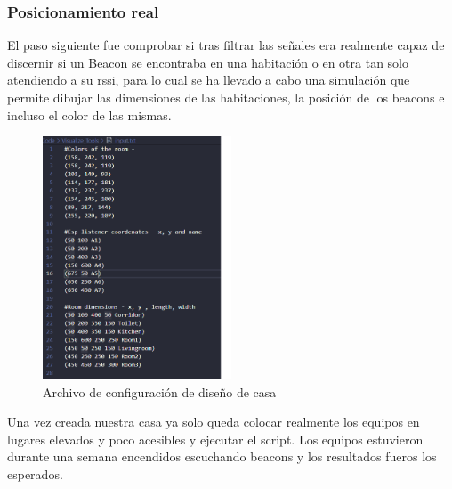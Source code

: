 \documentclass[a4paper ,12pt, onecolumn]{article}
\begin{document}
        \subsubsection{Posicionamiento real}
            El paso siguiente fue comprobar si tras filtrar las señales era realmente capaz de discernir si un Beacon se encontraba en una habitación
            o en otra tan solo atendiendo a su rssi, para lo cual se ha llevado a cabo una simulación que permite dibujar las dimensiones de las 
            habitaciones, la posición de los beacons e incluso el color de las mismas. 
            \begin{center}
                \begin{figure}[]
                    \centering
                    \includegraphics[width=0.5\textwidth]{../../Memmory/images/config_file_house.PNG}
                    \caption{Archivo de configuración de diseño de casa}
                    \label{fig:mesh11}
                \end{figure}
            \end{center}
            Una vez creada nuestra casa ya solo queda colocar realmente los equipos en lugares elevados y poco acesibles y ejecutar el script.
            Los equipos estuvieron durante una semana encendidos escuchando beacons y los resultados fueros los esperados.
\end{document}
